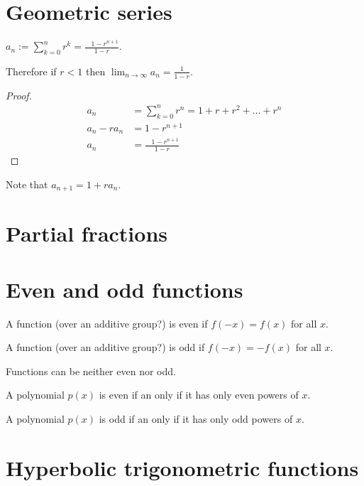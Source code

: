 \section{Geometric series}
\begin{theorem*}
  $a_n := \sum_{k=0}^nr^k = \frac{~~~~1 - r^{n+1}}{1 - r}$.

  Therefore if $r < 1$ then $\lim_{n \to \infty} a_n = \frac{1}{1 - r}$.
\end{theorem*}
\begin{proof}
  \begin{align*}
    a_n          &= \sum_{k=0}^nr^n = 1 + r + r^2 + \ldots + r^n\\
    a_n - ra_n  &= 1 - r^{n+1}\\
    a_n          &= \frac{~~~~1 - r^{n+1}}{1 - r}
  \end{align*}
\end{proof}
\begin{remark*}
  Note that $a_{n+1} = 1 + ra_n$.
\end{remark*}

\section{Partial fractions}


\section{Even and odd functions}

\begin{definition*}
  A function (over an additive group?) is even if $f(-x) = f(x)$ for all $x$.

  A function (over an additive group?) is odd if $f(-x) = -f(x)$ for all $x$.
\end{definition*}

Functions can be neither even nor odd.

\begin{claim*}
  A polynomial $p(x)$ is even if an only if it has only even powers of $x$.

  A polynomial $p(x)$ is odd if an only if it has only odd powers of $x$.
\end{claim*}

\section{Hyperbolic trigonometric functions}\label{foundations-hyperbolic-trig-functions}

